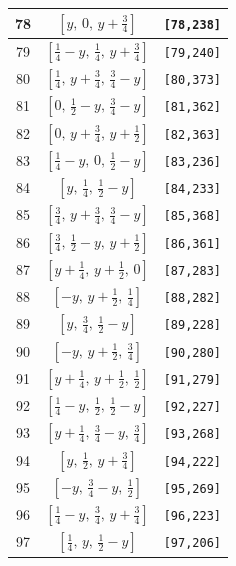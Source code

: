 \documentclass[fleqn,8pt]{jsarticle}
\begin{document}
\begin{longtable}{ccc}
78 & $\left[ y,\, 0,\, y + \frac{3}{4} \right]$ & {\tt [78,238]} \\ \hline
79 & $\left[ \frac{1}{4} - y,\, \frac{1}{4},\, y + \frac{3}{4} \right]$ & {\tt [79,240]} \\ \hline
80 & $\left[ \frac{1}{4},\, y + \frac{3}{4},\, \frac{3}{4} - y \right]$ & {\tt [80,373]} \\ \hline
81 & $\left[ 0,\, \frac{1}{2} - y,\, \frac{3}{4} - y \right]$ & {\tt [81,362]} \\ \hline
82 & $\left[ 0,\, y + \frac{3}{4},\, y + \frac{1}{2} \right]$ & {\tt [82,363]} \\ \hline
83 & $\left[ \frac{1}{4} - y,\, 0,\, \frac{1}{2} - y \right]$ & {\tt [83,236]} \\ \hline
84 & $\left[ y,\, \frac{1}{4},\, \frac{1}{2} - y \right]$ & {\tt [84,233]} \\ \hline
85 & $\left[ \frac{3}{4},\, y + \frac{3}{4},\, \frac{3}{4} - y \right]$ & {\tt [85,368]} \\ \hline
86 & $\left[ \frac{3}{4},\, \frac{1}{2} - y,\, y + \frac{1}{2} \right]$ & {\tt [86,361]} \\ \hline
87 & $\left[ y + \frac{1}{4},\, y + \frac{1}{2},\, 0 \right]$ & {\tt [87,283]} \\ \hline
88 & $\left[ - y,\, y + \frac{1}{2},\, \frac{1}{4} \right]$ & {\tt [88,282]} \\ \hline
89 & $\left[ y,\, \frac{3}{4},\, \frac{1}{2} - y \right]$ & {\tt [89,228]} \\ \hline
90 & $\left[ - y,\, y + \frac{1}{2},\, \frac{3}{4} \right]$ & {\tt [90,280]} \\ \hline
91 & $\left[ y + \frac{1}{4},\, y + \frac{1}{2},\, \frac{1}{2} \right]$ & {\tt [91,279]} \\ \hline
92 & $\left[ \frac{1}{4} - y,\, \frac{1}{2},\, \frac{1}{2} - y \right]$ & {\tt [92,227]} \\ \hline
93 & $\left[ y + \frac{1}{4},\, \frac{3}{4} - y,\, \frac{3}{4} \right]$ & {\tt [93,268]} \\ \hline
94 & $\left[ y,\, \frac{1}{2},\, y + \frac{3}{4} \right]$ & {\tt [94,222]} \\ \hline
95 & $\left[ - y,\, \frac{3}{4} - y,\, \frac{1}{2} \right]$ & {\tt [95,269]} \\ \hline
96 & $\left[ \frac{1}{4} - y,\, \frac{3}{4},\, y + \frac{3}{4} \right]$ & {\tt [96,223]} \\ \hline
97 & $\left[ \frac{1}{4},\, y,\, \frac{1}{2} - y \right]$ & {\tt [97,206]} \\ \hline

\end{longtable}
\end{document}
